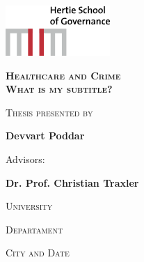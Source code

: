\begin{titlepage}
\includegraphics[width=.23  \textwidth]{templates/logo.png}
\vspace{+.21in}
\parbox[][3in][s]{6in}{%
  {\vspace{+.05in} \par}
  \centering          
  {\small \textsc{ \bfseries {Healthcare and Crime\\ What is my subtitle?}} \par}
  \vspace*{\fill}
  {\small \textsc{Thesis presented by} \par}
  \vspace*{\fill}
  {\small \bfseries {Devvart Poddar} \par}
  \vspace*{\fill}
  \vspace*{\fill}
  \vspace*{\fill}
  \vspace*{\fill}     
  \vspace{+.1in}
  \vspace*{\fill}
  \vspace{+.5in}
  \vspace{+.3in}
  {Advisors: \par}
  \vspace*{\fill}     
  {\small \bfseries {Dr. Prof. Christian Traxler} \par}
  \vspace*{\fill}
  \vspace{+.5in}
  \vspace{+.4in}
  \parbox[][.35in][s]{6in}{%
    \vspace*{\fill}
    {\centering
      \textsc{University} \par
      \textsc{Departament} \par
      \textsc{City and Date} \par     
    }
    \vspace*{\fill}
  }
}
\end{titlepage}